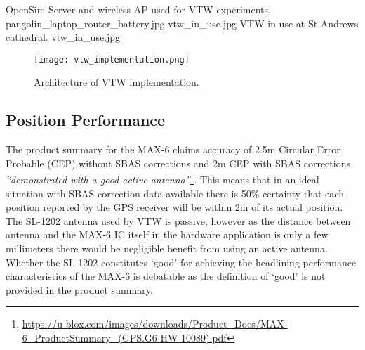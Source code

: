  {OpenSim Server and wireless AP used for VTW experiments.} {pangolin_laptop_router_battery.jpg}
       {vtw_in_use.jpg} {VTW in use at St Andrews cathedral.} {vtw_in_use.jpg}

\begin{figure}[h]
\centering
  \texttt{[image: vtw\_implementation.png]}
  \caption{Architecture of VTW implementation.}
  \label{vtw_implementation.png}
\end{figure}


\subsection{Position Performance}

\newcommand{\ubloxcepFootnote}{\footnote{\url{https://u-blox.com/images/downloads/Product_Docs/MAX-6_ProductSummary_(GPS.G6-HW-10089).pdf}}}

\newcommand{\htconesFootnote}{\footnote{\url{http://www.htc.com/uk/smartphones/htc-one-s/}}}

\newcommand{\snapdragonFootnote}{\footnote{\url{https://www.qualcomm.com/products/snapdragon/processors/s4-s1}}}

\newcommand{\mytracksFootnote}{\footnote{\url{https://play.google.com/store/apps/details?id=com.google.android.maps.mytracks&hl=en}}}

\newcommand{\hausdorffFootnote}{\footnote{\url{http://postgis.net/docs/ST_HausdorffDistance.html}}}


The product summary for the MAX-6 claims accuracy of 2.5m Circular Error Probable (CEP) without SBAS corrections and 2m CEP with SBAS corrections \textit{``demonstrated with a good active antenna''}\ubloxcepFootnote{}. This means that in an ideal situation with SBAS correction data available there is 50\% certainty that each position reported by the GPS receiver will be within 2m of its actual position. The SL-1202 antenna used by VTW is passive, however as the distance between antenna and the MAX-6 IC itself in the hardware application is only a few millimeters there would be negligible benefit from using an active antenna. Whether the SL-1202 constitutes `good' for achieving the headlining performance characteristics of the MAX-6 is debatable as the definition of `good' is not provided in the product summary.

